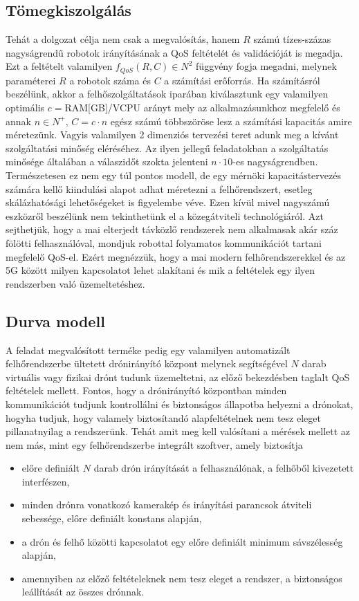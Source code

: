 \subsection{Tömegkiszolgálás}
\noindent
Tehát a dolgozat célja nem csak a megvalósítás, hanem $R$ számú tízes-százas nagyságrendű robotok irányításának a QoS feltételét és validációját is megadja. Ezt a feltételt valamilyen $f_{QoS}(R,C)\in N^2$ függvény fogja megadni, melynek paraméterei $R$ a robotok száma és $C$ a számítási erőforrás. Ha számításról beszélünk, akkor a felhőszolgáltatások iparában kiválasztunk egy valamilyen optimális $c=$RAM[GB]/VCPU arányt mely az alkalmazásunkhoz megfelelő és annak $n\in N^+$, $C=c\cdot n$ egész számú többszöröse lesz a számítási kapacitás amire méretezünk. Vagyis valamilyen 2 dimenziós tervezési teret adunk meg a kívánt szolgáltatási minőség eléréséhez. Az ilyen jellegű feladatokban a szolgáltatás minősége általában a válaszidőt szokta jelenteni $n \cdot 10$-es nagyságrendben. Természetesen ez nem egy túl pontos modell, de egy mérnöki kapacitástervezés számára kellő kiindulási alapot adhat méretezni a felhőrendszert, esetleg skálázhatósági lehetőségeket is figyelembe véve.
Ezen kívül mivel nagyszámú eszközről beszélünk nem tekinthetünk el a közegátviteli technológiáról. Azt sejthetjük, hogy a mai elterjedt távközlő rendszerek nem alkalmasak akár száz fölötti felhasználóval, mondjuk robottal folyamatos kommunikációt tartani megfelelő QoS-el. Ezért megnézzük, hogy a mai modern felhőrendszerekkel és az 5G között milyen kapcsolatot lehet alakítani és mik a feltételek egy ilyen rendszerben való üzemeltetéshez. \\

\subsection{Durva modell}
\noindent
A feladat megvalósított terméke pedig egy valamilyen automatizált felhőrendszerbe ültetett drónirányító központ melynek segítségével $N$ darab virtuális vagy fizikai drónt tudunk üzemeltetni, az előző bekezdésben taglalt QoS feltételek mellett. Fontos, hogy a drónirányító központban minden kommunikációt tudjunk kontrollálni és biztonságos állapotba helyezni a drónokat, hogyha tudjuk, hogy valamely biztosítandó alapfeltételnek nem tesz eleget pillanatnyilag a rendszerünk. Tehát amit meg kell valósítani a mérések mellett az nem más, mint egy felhőrendszerbe integrált szoftver, amely biztosítja 
\begin{itemize}
	\item előre definiált $N$ darab drón irányítását a felhasználónak, a felhőből kivezetett interfészen,
	\item minden drónra vonatkozó kamerakép és irányítási parancsok átviteli sebessége, előre definiált konstans alapján,
	\item a drón és felhő közötti kapcsolatot egy előre definiált minimum sávszélesség alapján,
	\item amennyiben az előző feltételeknek nem tesz eleget a rendszer, a biztonságos leállítását az összes drónnak.
\end{itemize}

